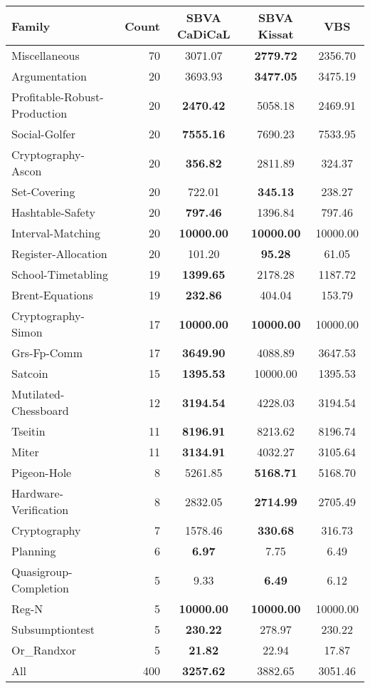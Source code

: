 \begin{tabular}{lr|cc|c}
\toprule
Family & Count & SBVA CaDiCaL & SBVA Kissat & VBS \\
\midrule
Miscellaneous & 70 & 3071.07 & \bfseries 2779.72 & 2356.70 \\
Argumentation & 20 & 3693.93 & \bfseries 3477.05 & 3475.19 \\
Profitable-Robust-Production & 20 & \bfseries 2470.42 & 5058.18 & 2469.91 \\
Social-Golfer & 20 & \bfseries 7555.16 & 7690.23 & 7533.95 \\
Cryptography-Ascon & 20 & \bfseries 356.82 & 2811.89 & 324.37 \\
Set-Covering & 20 & 722.01 & \bfseries 345.13 & 238.27 \\
Hashtable-Safety & 20 & \bfseries 797.46 & 1396.84 & 797.46 \\
Interval-Matching & 20 & \bfseries 10000.00 & \bfseries 10000.00 & 10000.00 \\
Register-Allocation & 20 & 101.20 & \bfseries 95.28 & 61.05 \\
School-Timetabling & 19 & \bfseries 1399.65 & 2178.28 & 1187.72 \\
Brent-Equations & 19 & \bfseries 232.86 & 404.04 & 153.79 \\
Cryptography-Simon & 17 & \bfseries 10000.00 & \bfseries 10000.00 & 10000.00 \\
Grs-Fp-Comm & 17 & \bfseries 3649.90 & 4088.89 & 3647.53 \\
Satcoin & 15 & \bfseries 1395.53 & 10000.00 & 1395.53 \\
Mutilated-Chessboard & 12 & \bfseries 3194.54 & 4228.03 & 3194.54 \\
Tseitin & 11 & \bfseries 8196.91 & 8213.62 & 8196.74 \\
Miter & 11 & \bfseries 3134.91 & 4032.27 & 3105.64 \\
Pigeon-Hole & 8 & 5261.85 & \bfseries 5168.71 & 5168.70 \\
Hardware-Verification & 8 & 2832.05 & \bfseries 2714.99 & 2705.49 \\
Cryptography & 7 & 1578.46 & \bfseries 330.68 & 316.73 \\
Planning & 6 & \bfseries 6.97 & 7.75 & 6.49 \\
Quasigroup-Completion & 5 & 9.33 & \bfseries 6.49 & 6.12 \\
Reg-N & 5 & \bfseries 10000.00 & \bfseries 10000.00 & 10000.00 \\
Subsumptiontest & 5 & \bfseries 230.22 & 278.97 & 230.22 \\
Or\_Randxor & 5 & \bfseries 21.82 & 22.94 & 17.87 \\
\hline All & 400 & \bfseries 3257.62 & 3882.65 & 3051.46 \\
\bottomrule
\end{tabular}
